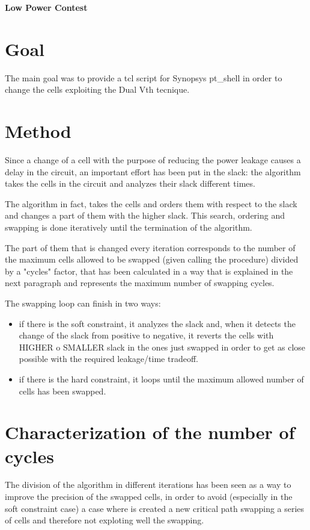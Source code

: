 \documentclass[10pt, english, oneside]{article}
\begin{document}
\begin{center}
  \huge \textbf{Low Power Contest}
\end{center}

\justify

\section{Goal} \label{sec:goal}
The main goal was to provide a tcl script for Synopsys pt\_shell in order to
change the cells exploiting the Dual Vth tecnique.
\section{Method} \label{sec:method}
Since a change of a cell with the purpose of reducing the power leakage causes a
delay in the circuit, an important effort has been put in the slack: the
algorithm takes the cells in the circuit and analyzes their slack different times.

The algorithm in fact, takes the cells and orders them with respect to the slack
and changes a part of them with the higher slack.
This search, ordering and swapping is done iteratively until the termination of
the algorithm.

The part of them that is changed every iteration corresponds to the number of
the maximum cells allowed to be swapped (given calling the procedure) divided by
a "cycles" factor, that has been calculated in a way that is explained in the
next paragraph and represents the maximum number of swapping cycles.

The swapping loop can finish in two ways:
\begin{itemize}
  \item if there is the soft constraint, it analyzes the slack and, when it detects the
change of the slack from positive to negative, it reverts the cells with HIGHER
o SMALLER slack in the ones just swapped in order to get as close possible with
the required leakage/time tradeoff.
  \item if there is the hard constraint, it loops until the maximum allowed number of
cells has been swapped.
\end{itemize}
\section{Characterization of the number of cycles} \label{sec:characterization}
The division of the algorithm in different iterations has been seen as a way to
improve the precision of the swapped cells, in order to avoid (especially in the
soft constraint case) a case where is created a new critical path swapping a
series of cells and therefore not exploting well the swapping.
\end{document}

